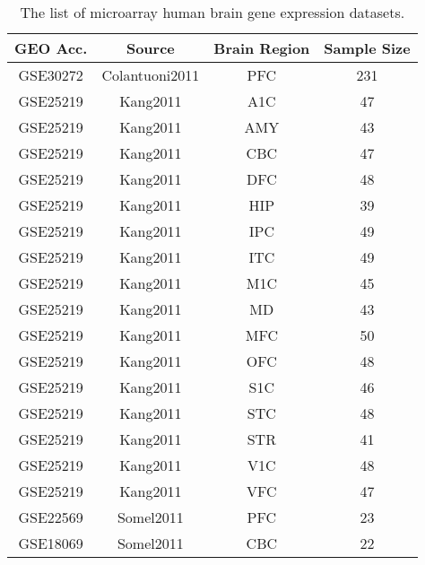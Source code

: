 \begin{table}[ht]
\centering
\caption{The list of microarray human brain gene expression datasets.}\label{table:table1}
\begin{tabular}{|c c c c|}
 \hline
 \textbf{GEO Acc.} & \textbf{Source} & \textbf{Brain Region} & \textbf{Sample Size} \\ [0.5ex] 
 \hline\hline
 GSE30272 & Colantuoni2011 & PFC & 231 \\ 
 \hline
 GSE25219 & Kang2011 & A1C & 47 \\
 \hline
 GSE25219 & Kang2011 & AMY & 43 \\
 \hline
 GSE25219 & Kang2011 & CBC & 47 \\
 \hline
 GSE25219 & Kang2011 & DFC & 48 \\
 \hline
 GSE25219 & Kang2011 & HIP & 39 \\
 \hline
 GSE25219 & Kang2011 & IPC & 49 \\
 \hline
 GSE25219 & Kang2011 & ITC & 49 \\
 \hline
 GSE25219 & Kang2011 & M1C & 45 \\
 \hline
 GSE25219 & Kang2011 & MD & 43 \\
 \hline
 GSE25219 & Kang2011 & MFC & 50 \\
 \hline
 GSE25219 & Kang2011 & OFC & 48 \\
 \hline
 GSE25219 & Kang2011 & S1C & 46 \\
 \hline
 GSE25219 & Kang2011 & STC & 48 \\
 \hline
 GSE25219 & Kang2011 & STR & 41 \\
 \hline
 GSE25219 & Kang2011 & V1C & 48 \\
 \hline
 GSE25219 & Kang2011 & VFC & 47 \\
 \hline
 GSE22569 & Somel2011 & PFC & 23 \\
 \hline
 GSE18069 & Somel2011 & CBC & 22 \\
\hline
\end{tabular}
\end{table}

